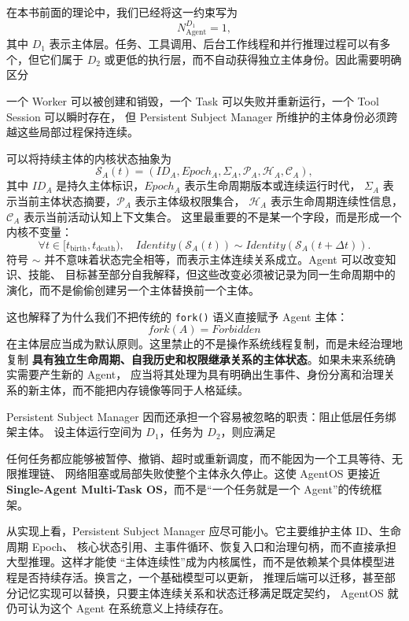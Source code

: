 在本书前面的理论中，我们已经将这一约束写为
\[
N_{\mathrm{Agent}}^{D_1}=1,
\]
其中 $D_1$ 表示主体层。任务、工具调用、后台工作线程和并行推理过程可以有多个，但它们属于
$D_2$ 或更低的执行层，而不自动获得独立主体身份。因此需要明确区分
\begin{statementbox}
\centering
{}
\end{statementbox}
一个 Worker 可以被创建和销毁，一个 Task 可以失败并重新运行，一个 Tool Session 可以瞬时存在，
但 Persistent Subject Manager 所维护的主体身份必须跨越这些局部过程保持连续。

可以将持续主体的内核状态抽象为
\[
\mathcal S_A(t)
=
\left(
ID_A,
Epoch_A,
\Sigma_A,
\mathcal P_A,
\mathcal H_A,
\mathcal C_A
\right),
\]
其中 $ID_A$ 是持久主体标识，$Epoch_A$ 表示生命周期版本或连续运行时代，
$\Sigma_A$ 表示当前主体状态摘要，$\mathcal P_A$ 表示主体级权限集合，
$\mathcal H_A$ 表示生命周期连续性信息，$\mathcal C_A$ 表示当前活动认知上下文集合。
这里最重要的不是某一个字段，而是形成一个内核不变量：
\[
\boxed{
\forall t\in[t_{\mathrm{birth}},t_{\mathrm{death}}),
\quad
Identity(\mathcal S_A(t))
\sim
Identity(\mathcal S_A(t+\Delta t)).
}
\]
符号 $\sim$ 并不意味着状态完全相等，而表示主体连续关系成立。Agent 可以改变知识、技能、
目标甚至部分自我解释，但这些改变必须被记录为同一生命周期中的演化，而不是偷偷创建另一个主体替换前一个主体。

这也解释了为什么我们不把传统的 \texttt{fork()} 语义直接赋予 Agent 主体：
\[
fork(A)=Forbidden
\]
在主体层应当成为默认原则。这里禁止的不是操作系统线程复制，而是未经治理地复制
\textbf{具有独立生命周期、自我历史和权限继承关系的主体状态}。如果未来系统确实需要产生新的 Agent，
应当将其处理为具有明确出生事件、身份分离和治理关系的新主体，而不能把内存镜像等同于人格延续。

Persistent Subject Manager 因而还承担一个容易被忽略的职责：阻止低层任务绑架主体。
设主体运行空间为 $D_1$，任务为 $D_2$，则应满足
\begin{statementbox}
\centering
{}
\end{statementbox}
任何任务都应能够被暂停、撤销、超时或重新调度，而不能因为一个工具等待、无限推理链、
网络阻塞或局部失败使整个主体永久停止。这使 AgentOS 更接近
\textbf{Single-Agent Multi-Task OS}，而不是``一个任务就是一个 Agent''的传统框架。

从实现上看，Persistent Subject Manager 应尽可能小。它主要维护主体 ID、生命周期 Epoch、
核心状态引用、主事件循环、恢复入口和治理句柄，而不直接承担大型推理。这样才能使
``主体连续性''成为内核属性，而不是依赖某个具体模型进程是否持续存活。换言之，一个基础模型可以更新，
推理后端可以迁移，甚至部分记忆实现可以替换，只要主体连续关系和状态迁移满足既定契约，
AgentOS 就仍可认为这个 Agent 在系统意义上持续存在。


